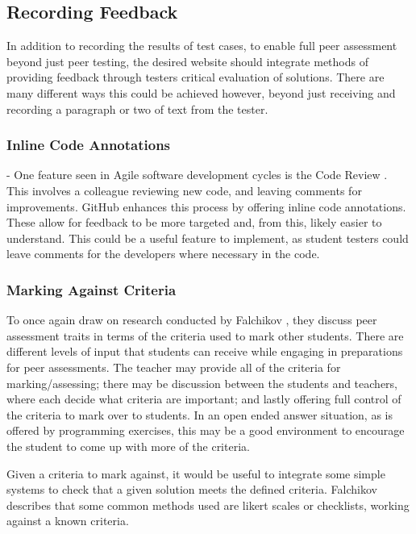 \documentclass[a4paper,11pt]{report}
\begin{document}
\subsection{Recording Feedback}
In addition to recording the results of test cases, to enable full peer assessment beyond just peer testing, the desired website should integrate methods of providing feedback through testers critical evaluation of solutions. There are many different ways this could be achieved however, beyond just receiving and recording a paragraph or two of text from the tester.\par
\subsubsection*{Inline Code Annotations} - One feature seen in Agile software development cycles is the Code Review \cite{github_project_2016}. This involves a colleague reviewing new code, and leaving comments for improvements. GitHub enhances this process by offering inline code annotations. These allow for feedback to be more targeted and, from this, likely easier to understand. This could be a useful feature to implement, as student testers could leave comments for the developers where necessary in the code.
\subsubsection*{Marking Against Criteria} 
To once again draw on research conducted by Falchikov \cite{falchikov_improving_2013}, they discuss peer assessment traits in terms of the criteria used to mark other students. There are different levels of input that students can receive while engaging in preparations for peer assessments. The teacher may provide all of the criteria for marking/assessing; there may be discussion between the students and teachers, where each decide what criteria are important; and lastly offering full control of the criteria to mark over to students. In an open ended answer situation, as is offered by programming exercises, this may be a good environment to encourage the student to come up with more of the criteria.\par
Given a criteria to mark against, it would be useful to integrate some simple systems to check that a given solution meets the defined criteria. Falchikov describes that some common methods used are likert scales or checklists, working against a known criteria.\par
\end{document}
